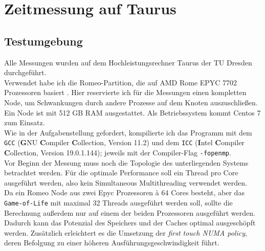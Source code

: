 \documentclass[german,plainarticle,hyperref,utf8]{zihpub}
\begin{document}
	\section{Zeitmessung auf Taurus}
	\subsection{Testumgebung} \label{umgebung}
	Alle Messungen wurden auf dem Hochleistungsrechner Taurus der TU Dresden durchgeführt.\\
	Verwendet habe ich die Romeo-Partition, die auf AMD Rome EPYC 7702 Prozessoren basiert \cite{hpc}. Hier reservierte ich für die Messungen einen kompletten Node, um Schwankungen durch andere Prozesse auf dem Knoten auszuschließen. Ein Node ist mit 512 GB RAM ausgestattet. Als Betriebssystem kommt Centos 7 zum Einsatz.\\
	Wie in der Aufgabenstellung gefordert, kompilierte ich das Programm mit dem \texttt{GCC} (\textbf{G}NU \textbf{C}ompiler \textbf{C}ollection, Version 11.2) und dem \texttt{ICC} (\textbf{I}ntel \textbf{C}ompiler \textbf{C}ollection, Version 19.0.1.144); jeweils mit der Compiler-Flag \texttt{-fopenmp}.\\
	
	Vor Beginn der Messung muss noch die Topologie des unterliegenden Systems betrachtet werden. Für die optimale Performance soll ein Thread pro Core ausgeführt werden, also kein Simultaneous Multithreading verwendet werden.\\
	Da ein Romeo Node aus zwei Epyc Prozessoren \`{a} 64 Cores besteht, aber das \texttt{Game-of-Life} mit maximal 32 Threads ausgeführt werden soll, sollte die Berechnung außerdem nur auf einem der beiden Prozessoren ausgeführt werden. Dadurch kann das Potenzial des Speichers und der Caches optimal ausgeschöpft werden. Zusätzlich erleichtert es die Umsetzung der \textit{first touch NUMA policy}, deren Befolgung zu einer höheren Ausführungsgeschwindigkeit führt.\\
	
\end{document}
